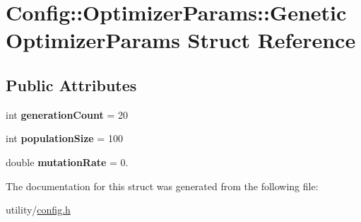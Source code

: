 \hypertarget{struct_config_1_1_optimizer_params_1_1_genetic_optimizer_params}{}\section{Config\+:\+:Optimizer\+Params\+:\+:Genetic\+Optimizer\+Params Struct Reference}
\label{struct_config_1_1_optimizer_params_1_1_genetic_optimizer_params}
\subsection*{Public Attributes}
\begin{DoxyCompactItemize}
\item 
\mbox{\label{struct_config_1_1_optimizer_params_1_1_genetic_optimizer_params_ada7fdf8f2b62bf9ec608bd89d78b5e0b}} 
int {\bfseries generation\+Count} = 20
\item 
\mbox{\label{struct_config_1_1_optimizer_params_1_1_genetic_optimizer_params_a7821ecfef62928f679f15feeda39d734}} 
int {\bfseries population\+Size} = 100
\item 
\mbox{\label{struct_config_1_1_optimizer_params_1_1_genetic_optimizer_params_a4bd3aca3e2ae556590d97f720c07d4fc}} 
double {\bfseries mutation\+Rate} = 0.
\end{DoxyCompactItemize}


The documentation for this struct was generated from the following file\+:\begin{DoxyCompactItemize}
\item 
utility/\hyperlink{config_8h}{config.\+h}\end{DoxyCompactItemize}

